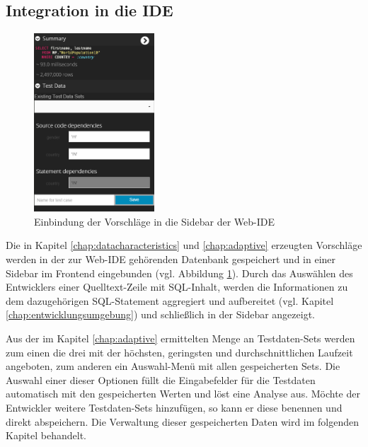\subsection{Integration in die IDE}
\begin{figure}[ht]
	\centering
  \includegraphics[width=0.4\textwidth]{figures/integration.png}
	\caption{Einbindung der Vorschläge in die Sidebar der Web-IDE}
	\label{fig:ideintegration}
\end{figure}

Die in Kapitel \ref{chap:datacharacteristics} und \ref{chap:adaptive} erzeugten Vorschläge werden in der zur Web-IDE gehörenden Datenbank gespeichert und in einer Sidebar im Frontend eingebunden (vgl. Abbildung \ref{fig:ideintegration}).
Durch das Auswählen des Entwicklers einer Quelltext-Zeile mit SQL-Inhalt, werden die Informationen zu dem dazugehörigen SQL-Statement aggregiert und aufbereitet (vgl. Kapitel \ref{chap:entwicklungsumgebung}) und schließlich in der Sidebar angezeigt.

Aus der im Kapitel \ref{chap:adaptive} ermittelten Menge an Testdaten-Sets werden zum einen die drei mit der höchsten, geringsten und durchschnittlichen Laufzeit angeboten, zum anderen ein Auswahl-Menü mit allen gespeicherten Sets.
Die Auswahl einer dieser Optionen füllt die Eingabefelder für die Testdaten automatisch mit den gespeicherten Werten und löst eine Analyse aus.
Möchte der Entwickler weitere Testdaten-Sets hinzufügen, so kann er diese benennen und direkt abspeichern.
Die Verwaltung dieser gespeicherten Daten wird im folgenden Kapitel behandelt.